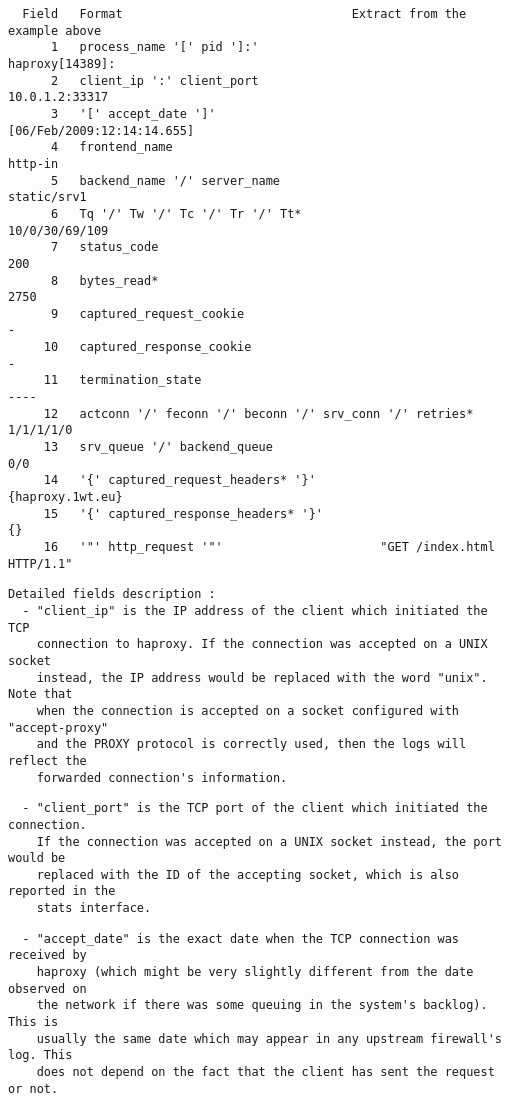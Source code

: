 \begin{verbatim}
  Field   Format                                Extract from the example above
      1   process_name '[' pid ']:'                            haproxy[14389]:
      2   client_ip ':' client_port                             10.0.1.2:33317
      3   '[' accept_date ']'                       [06/Feb/2009:12:14:14.655]
      4   frontend_name                                                http-in
      5   backend_name '/' server_name                             static/srv1
      6   Tq '/' Tw '/' Tc '/' Tr '/' Tt*                       10/0/30/69/109
      7   status_code                                                      200
      8   bytes_read*                                                     2750
      9   captured_request_cookie                                            -
     10   captured_response_cookie                                           -
     11   termination_state                                               ----
     12   actconn '/' feconn '/' beconn '/' srv_conn '/' retries*    1/1/1/1/0
     13   srv_queue '/' backend_queue                                      0/0
     14   '{' captured_request_headers* '}'                   {haproxy.1wt.eu}
     15   '{' captured_response_headers* '}'                                {}
     16   '"' http_request '"'                      "GET /index.html HTTP/1.1"
\end{verbatim}

\begin{verbatim}
Detailed fields description :
  - "client_ip" is the IP address of the client which initiated the TCP
    connection to haproxy. If the connection was accepted on a UNIX socket
    instead, the IP address would be replaced with the word "unix". Note that
    when the connection is accepted on a socket configured with "accept-proxy"
    and the PROXY protocol is correctly used, then the logs will reflect the
    forwarded connection's information.
\end{verbatim}

\begin{verbatim}
  - "client_port" is the TCP port of the client which initiated the connection.
    If the connection was accepted on a UNIX socket instead, the port would be
    replaced with the ID of the accepting socket, which is also reported in the
    stats interface.
\end{verbatim}

\begin{verbatim}
  - "accept_date" is the exact date when the TCP connection was received by
    haproxy (which might be very slightly different from the date observed on
    the network if there was some queuing in the system's backlog). This is
    usually the same date which may appear in any upstream firewall's log. This
    does not depend on the fact that the client has sent the request or not.
\end{verbatim}

